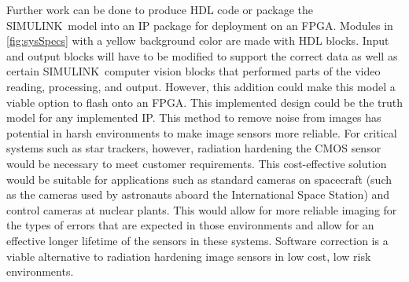 \par Further work can be done to produce HDL code or package the SIMULINK\textregisteredmark\ model into an IP package for deployment on an FPGA. Modules in \autoref{fig:sysSpecs} with a yellow background color are made with HDL blocks. Input and output blocks will have to be modified to support the correct data as well as certain SIMULINK\textregisteredmark\ computer vision blocks that performed parts of the video reading, processing, and output. However, this addition could make this model a viable option to flash onto an FPGA. This implemented design could be the truth model for any implemented IP. This method to remove noise from images has potential in harsh environments to make image sensors more reliable. For critical systems such as star trackers, however, radiation hardening the CMOS sensor would be necessary to meet customer requirements. This cost-effective solution would be suitable for applications such as standard cameras on spacecraft (such as the cameras used by astronauts aboard the International Space Station) and control cameras at nuclear plants. This would allow for more reliable imaging for the types of errors that are expected in those environments and allow for an effective longer lifetime of the sensors in these systems. Software correction is a viable alternative to radiation hardening image sensors in low cost, low risk environments.